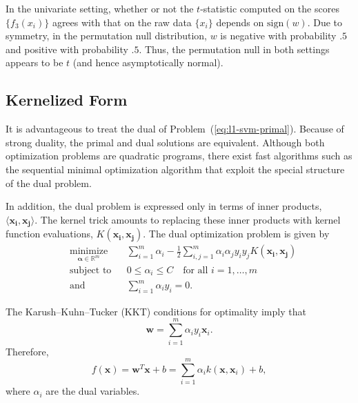 In the univariate setting, whether or not the $t$-statistic computed
on the scores $\{f_3(x_i)\}$ agrees with that on the raw data
$\{x_i\}$ depends on $\text{sign}(w)$.  Due to symmetry, in the
permutation null distribution, $w$ is negative with probability $.5$
and positive with probability $.5$.  Thus, the permutation null in
both settings appears to be $t$ (and hence asymptotically normal).

\subsection{Kernelized Form}
It is advantageous to treat the dual \cite{boyd2004convex} of
Problem~(\ref{eq:l1-svm-primal}).  Because of strong duality,
the primal and dual solutions are equivalent.
Although both optimization problems
are quadratic programs, there exist fast algorithms such as the
sequential minimal optimization algorithm \cite{platt199912} that
exploit the special structure of the dual problem.

In addition, the dual problem is expressed only in terms of inner
products, $\langle \mathbf{x_i}, \mathbf{x_j} \rangle$.  The kernel trick
\cite{aizerman1964theoretical} amounts to replacing these inner products
with kernel function evaluations, $K(\mathbf{x_i}, \mathbf{x_j})$.  The
dual optimization problem is given by
\begin{equation}
\label{eq:l1-svm-dual}
\begin{aligned}
& \underset{{\boldsymbol \alpha} \in \mathbb{R}^m}{\text{minimize}}
& & \sum_{i=1}^m \alpha_i - \frac{1}{2} \sum_{i,j=1}^m \alpha_i \alpha_j y_i y_j K(\mathbf{x_i}, \mathbf{x_j})  \\
& \text{subject to}
& & 0 \leq \alpha_i \leq C \quad \text{for all } i=1,\ldots,m \\
& \text{and}
& & \sum_{i=1}^m \alpha_i y_i = 0.
\end{aligned}
\end{equation}

The Karush--Kuhn--Tucker (KKT) conditions for optimality imply that
\begin{equation*}
  \mathbf{w} = \sum_{i=1}^m \alpha_i y_i \mathbf{x}_i.
\end{equation*}
Therefore,
\begin{equation*}
  f(\mathbf{x}) = \mathbf{w}^T\mathbf{x} + b = \sum_{i=1}^m \alpha_i k(\mathbf{x}, \mathbf{x}_i) + b,
\end{equation*}
where $\alpha_i$ are the dual variables.

